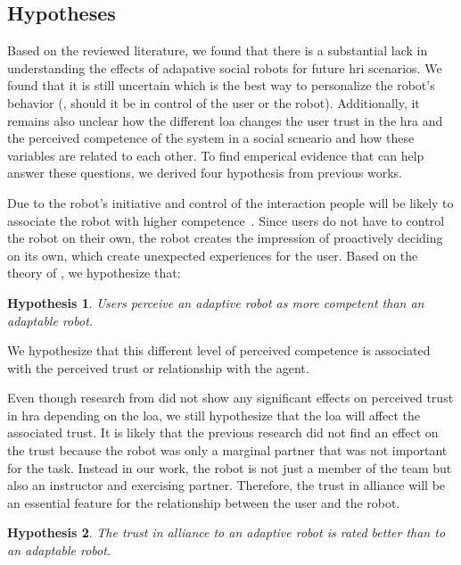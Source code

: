 \documentclass[twocolumn]{svjour3}          %
\newtheorem{hypo}{Hypothesis}
\begin{document}
\hypertarget{hypotheses}{%
\subsection{Hypotheses}\label{hypotheses}}

Based on the reviewed literature, we found that there is a substantial lack in understanding the effects of adapative social robots for future \gls{hri} scenarios. We found that it is still uncertain which is the best way to personalize the robot's behavior (\ie{}, should it be in control of the user or the robot). Additionally, it remains also unclear how the different \gls{loa} changes the user trust in the \gls{hra} and the perceived competence of the system in a social scneario and how these variables are related to each other. To find emperical evidence that can help answer these questions, we derived four hypothesis from previous works.

Due to the robot's initiative and control of the interaction people will
be likely to associate the robot with higher competence~\cite{hancock2011meta}. Since users do
not have to control the robot on their own, the robot creates the impression of proactively deciding on its own, which create unexpected experiences for the user. Based on the theory of \textcite{epley2007seeing}, we hypothesize that:

\begin{hypo}\label{hyp:adaptability:competence}
 Users perceive an \textit{adaptive} robot as more competent than an \textit{adaptable} robot.
\end{hypo}

 We hypothesize that this different level of perceived competence is associated with the perceived
trust or relationship with the agent.

Even though research from \textcite{rau2013effects} did not show any
significant effects on perceived trust in \gls{hra} depending on the \gls{loa}, we still
hypothesize that the \gls{loa} will affect the associated
trust. It is likely that the previous research did not find an
effect on the trust because the robot was only a marginal partner that
was not important for the task. Instead in our work, the robot is not
just a member of the team but also an instructor and exercising partner. Therefore, the trust in alliance will be an essential
feature for the relationship between the user and the robot.

\begin{hypo}\label{hyp:adaptability:trust}
 The trust in alliance to an \textit{adaptive} robot is rated better than to an \textit{adaptable} robot.
\end{hypo}
\end{document}
